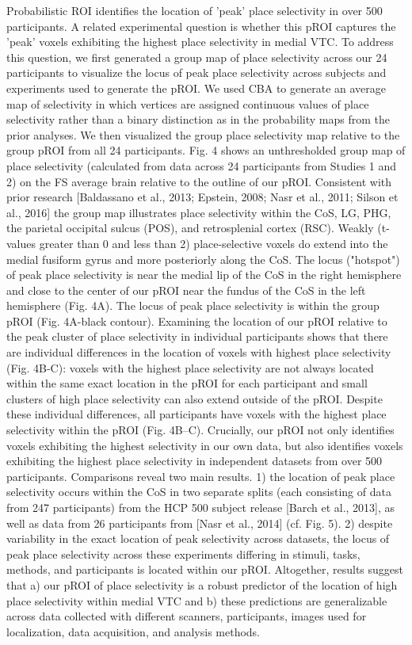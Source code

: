 Probabilistic ROI identifies the location of 'peak' place selectivity in over
500 participants.
%
A related experimental question is whether this pROI captures the 'peak' voxels
exhibiting the highest place selectivity in medial VTC.
%
To address this question, we first generated a group map of place selectivity
across our 24 participants to visualize the locus of peak place selectivity
across subjects and experiments used to generate the pROI.
%
We used CBA to generate an average map of selectivity in which vertices are
assigned continuous values of place selectivity rather than a binary distinction
as in the probability maps from the prior analyses.
%
We then visualized the group place selectivity map relative to the group pROI
from all 24 participants.
%
Fig. 4 shows an unthresholded group map of place selectivity (calculated from
data across 24 participants from Studies 1 and 2) on the FS average brain
relative to the outline of our pROI.
%
Consistent with prior research [Baldassano et al., 2013; Epstein, 2008; Nasr et
al., 2011; Silson et al., 2016] the group map illustrates place selectivity
within the CoS, LG, PHG, the parietal occipital sulcus (POS), and retrosplenial
cortex (RSC).
%
Weakly (t-values greater than 0 and less than 2) place-selective voxels do
extend into the medial fusiform gyrus and more posteriorly along the CoS.
%
The locus ("hotspot") of peak place selectivity is near the medial lip of the
CoS in the right hemisphere and close to the center of our pROI near the fundus
of the CoS in the left hemisphere (Fig. 4A).
%
The locus of peak place selectivity is within the group pROI (Fig. 4A-black
contour).
%
Examining the location of our pROI relative to the peak cluster of place
selectivity in individual participants shows that there are individual
differences in the location of voxels with highest place selectivity (Fig.
4B-C):
%
voxels with the highest place selectivity are not always located within the same
exact location in the pROI for each participant and small clusters of high place
selectivity can also extend outside of the pROI.
%
Despite these individual differences, all participants have voxels with the
highest place selectivity within the pROI (Fig. 4B–C).
%
Crucially, our pROI not only identifies voxels exhibiting the highest
selectivity in our own data, but also identifies voxels exhibiting the highest
place selectivity in independent datasets from over 500 participants.
%
Comparisons reveal two main results.
%
1) the location of peak place selectivity occurs within the CoS in two separate
splits (each consisting of data from 247 participants) from the HCP 500 subject
release [Barch et al., 2013], as well as data from 26 participants from [Nasr et
al., 2014] (cf. Fig. 5).
%
2) despite variability in the exact location of peak selectivity across
datasets, the locus of peak place selectivity across these experiments differing
in stimuli, tasks, methods, and participants is located within our pROI.
%
Altogether, results suggest that
%
a) our pROI of place selectivity is a robust predictor of the location of high
place selectivity within medial VTC and
%
b) these predictions are generalizable across data collected with different
scanners, participants, images used for localization, data acquisition, and
analysis methods.

